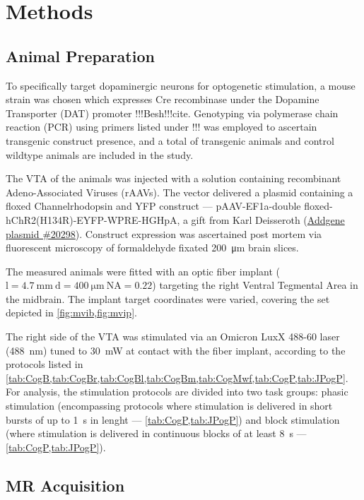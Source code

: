 \section{Methods}

\subsection{Animal Preparation}

To specifically target dopaminergic neurons for optogenetic stimulation, a mouse strain was chosen which expresses Cre recombinase under the Dopamine Transporter (DAT) promoter !!!Besh!!!cite.
Genotyping via polymerase chain reaction (PCR) using primers listed under !!! was employed to ascertain transgenic construct presence, and a total of  transgenic animals and  control wildtype animals are included in the study.

The VTA of the animals was injected with a solution containing recombinant Adeno-Associated Viruses (rAAVs).
The vector delivered a plasmid containing a floxed Channelrhodopsin and YFP construct ---
pAAV-EF1a-double floxed-hChR2(H134R)-EYFP-WPRE-HGHpA, a gift from Karl Deisseroth (\href{https://www.addgene.org/20298/}{Addgene plasmid \#20298}).
Construct expression was ascertained post mortem via fluorescent microscopy of formaldehyde fixated \SI{200}{\micro\metre} brain slices.

The measured animals were fitted with an optic fiber implant ($\mathrm{l=\SI{4.7}{\milli\meter} \ d=\SI{400}{\micro\meter} \ NA=0.22}$) targeting the right Ventral Tegmental Area in the midbrain.
The implant target coordinates were varied, covering the set depicted in \cref{fig:mvib,fig:mvip}.

The right side of the VTA was stimulated via an Omicron LuxX 488-60 laser (\SI{488}{\nano\meter}) tuned to \SI{30}{\milli\watt} at contact with the fiber implant, according to the protocols listed in \cref{tab:CogB,tab:CogBr,tab:CogBl,tab:CogBm,tab:CogMwf,tab:CogP,tab:JPogP}.
For analysis, the stimulation protocols are divided into two task groups: phasic stimulation (encompassing protocols where stimulation is delivered in short bursts of up to \SI{1}{\second} in lenght --- \cref{tab:CogP,tab:JPogP}) and block stimulation (where stimulation is delivered in continuous blocks of at least \SI{8}{\second} --- \cref{tab:CogP,tab:JPogP}).

\subsection{MR Acquisition}

